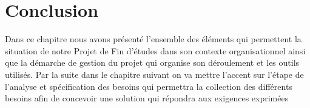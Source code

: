 \section{Conclusion}

Dans ce chapitre nous avons pr\'esent\'e l'ensemble des \'el\'ements qui permettent la situation de notre Projet de Fin d'\'etudes dans son contexte organisationnel ainsi que la d\'emarche de gestion du projet qui organise son d\'eroulement et les outils utilis\'es. Par la suite dans le chapitre suivant on va mettre l'accent sur l'\'etape de l'analyse et sp\'ecification des besoins qui permettra la collection des diff\'erents besoins afin de concevoir une solution qui r\'epondra aux exigences exprim\'ees